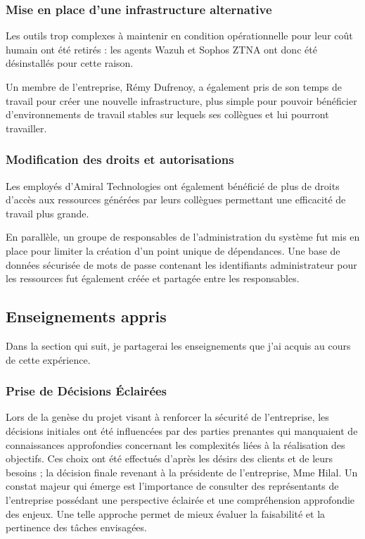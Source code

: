 \subsubsection{Mise en place d'une infrastructure alternative}
Les outils trop complexes à maintenir en condition opérationnelle pour leur coût humain ont été retirés : les agents Wazuh et Sophos ZTNA ont donc été désinstallés pour cette raison.

Un membre de l'entreprise, Rémy Dufrenoy, a également pris de son temps de travail pour créer une nouvelle infrastructure, plus simple pour pouvoir bénéficier d'environnements de travail stables sur lequels ses collègues et lui pourront travailler.

\subsubsection{Modification des droits et autorisations}
Les employés d'Amiral Technologies ont également bénéficié de plus de droits d'accès aux ressources générées par leurs collègues permettant une efficacité de travail plus grande.

En parallèle, un groupe de responsables de l'administration du système fut mis en place pour limiter la création d'un point unique de dépendances.
Une base de données sécurisée de mots de passe contenant les identifiants administrateur pour les ressources fut également créée et partagée entre les responsables.

\subsection{Enseignements appris}
Dans la section qui suit, je partagerai les enseignements que j'ai acquis au cours de cette expérience.
\subsubsection{Prise de Décisions Éclairées}

Lors de la genèse du projet visant à renforcer la sécurité de l'entreprise, les décisions initiales ont été influencées par des parties prenantes qui manquaient de connaissances approfondies concernant les complexités liées à la réalisation des objectifs.
Ces choix ont été effectués d'après les désirs des clients et de leurs besoins ; la décision finale revenant à la présidente de l'entreprise, Mme Hilal.
Un constat majeur qui émerge est l'importance de consulter des représentants de l'entreprise possédant une perspective éclairée et une compréhension approfondie des enjeux.
Une telle approche permet de mieux évaluer la faisabilité et la pertinence des tâches envisagées.

